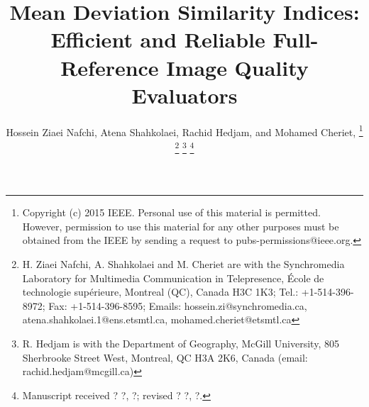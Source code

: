 

\usepackage{biograph}        \usepackage{afterpage}
\usepackage{array}
\usepackage{booktabs}

\usepackage{cite}
\usepackage{multiro                                                                                                                                                                                     w} 
\usepackage{rotating}

\usepackage{float}




\usepackage{color}
\usepackage{soul}

\usepackage{colortbl}




\def\rmd{{\rm d}}
\def\por1{\partial}
\DeclareMathOperator*{\argmax}{arg\,max}
\DeclareMathOperator*{\argmin}{arg\,min}
\DeclareMathOperator*{\submin}{\,min}

\makeatletter
  \newcommand\tinyv{\@setfontsize\tinyv{5pt}{7}}
\makeatother

\settowidth{\hspacephantom}{C = 0.00212}






\title{Mean Deviation Similarity Indices: Efficient and Reliable Full-Reference Image Quality Evaluators}





\author{Hossein Ziaei Nafchi, Atena Shahkolaei, Rachid Hedjam, \textnormal{and} Mohamed Cheriet,  \thanks{Copyright (c) 2015 IEEE. Personal use of this material is permitted. However, permission to use this material for any other purposes must be obtained from the IEEE by sending a request to pubs-permissions@ieee.org.}
\thanks{H. Ziaei Nafchi, A. Shahkolaei and M. Cheriet are with the Synchromedia Laboratory for Multimedia Communication in Telepresence,
\'Ecole de technologie sup\'erieure, Montreal (QC), Canada H3C 1K3; Tel.: +1-514-396-8972; Fax: +1-514-396-8595;
Emails: hossein.zi@synchromedia.ca, atena.shahkolaei.1@ens.etsmtl.ca, mohamed.cheriet@etsmtl.ca}
\thanks{R. Hedjam is with the Department of Geography, McGill University, 805 Sherbrooke Street West, Montreal, QC H3A 2K6, Canada (email: rachid.hedjam@mcgill.ca)}
\thanks{Manuscript received ? ?, ?; revised ? ?, ?.}}



